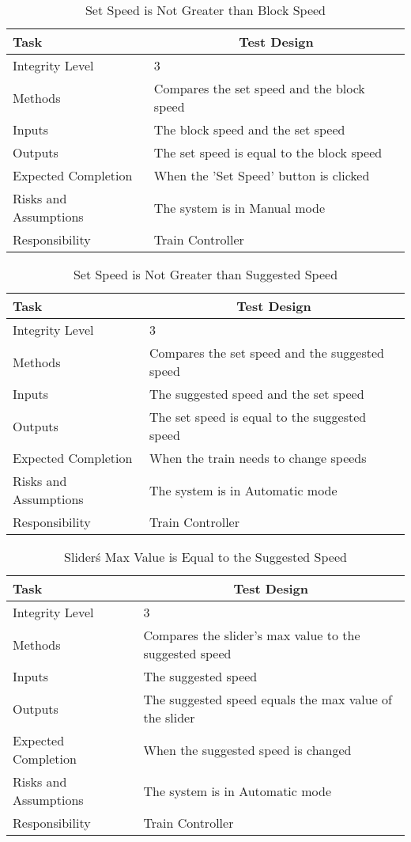 \documentclass[]{article}
\begin{document}
\begin{table}[H]
	\centering
	\caption{Set Speed is Not Greater than Block Speed}
	\begin{tabular}{|l|l|}
		\hline
		Task & \multicolumn{1}{c|}{Test Design} \\ \hline
		Integrity Level & 3 \\ \hline
		Methods & Compares the set speed and the block speed\\ \hline
		Inputs & The block speed and the set speed\\ \hline
		Outputs & The set speed is equal to the block speed \\ \hline
		Expected Completion & When the 'Set Speed' button is clicked\\ \hline
		Risks and Assumptions & The system is in Manual mode\\ \hline
		Responsibility & Train Controller\\ \hline
	\end{tabular}
\end{table}

\begin{table}[H]
	\centering
	\caption{Set Speed is Not Greater than Suggested Speed}
	\begin{tabular}{|l|l|}
		\hline
		Task & \multicolumn{1}{c|}{Test Design} \\ \hline
		Integrity Level & 3 \\ \hline
		Methods & Compares the set speed and the suggested speed\\ \hline
		Inputs & The suggested speed and the set speed\\ \hline
		Outputs & The set speed is equal to the suggested speed \\ \hline
		Expected Completion & When the train needs to change speeds\\ \hline
		Risks and Assumptions & The system is in Automatic mode \\ \hline
		Responsibility &  Train Controller\\ \hline
	\end{tabular}
\end{table}

\begin{table}[H]
	\centering
	\caption{Slider\'s Max Value is Equal to the Suggested Speed}
	\begin{tabular}{|l|l|}
		\hline
		Task & \multicolumn{1}{c|}{Test Design} \\ \hline
		Integrity Level & 3 \\ \hline
		Methods & Compares the slider's max value to the suggested speed\\ \hline
		Inputs & The suggested speed\\ \hline
		Outputs & The suggested speed equals the max value of the slider \\ \hline
		Expected Completion & When the suggested speed is changed\\ \hline
		Risks and Assumptions & The system is in Automatic mode \\ \hline
		Responsibility &  Train Controller\\ \hline
	\end{tabular}
\end{table}
\end{document}
